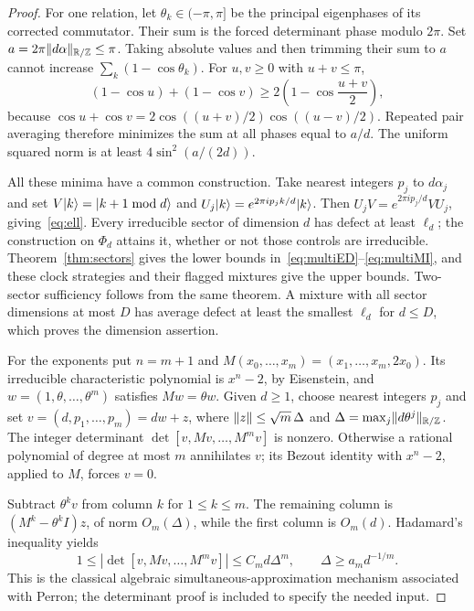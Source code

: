 \begin{proof}
For one relation, let $\theta_k\in(-\pi,\pi]$ be the principal eigenphases of its corrected commutator. Their sum is the forced determinant phase modulo $2\pi$. Set $a=2\pi\lVert d\alpha\rVert_{\mathbb R/\mathbb Z}\le\pi$. Taking absolute values and then trimming their sum to $a$ cannot increase $\sum_k(1-\cos\theta_k)$. For $u,v\ge0$ with $u+v\le\pi$,
\[
 (1-\cos u)+(1-\cos v)\ge2\left(1-\cos\frac{u+v}2\right),
\]
because $\cos u+\cos v=2\cos((u+v)/2)\cos((u-v)/2)$. Repeated pair averaging therefore minimizes the sum at all phases equal to $a/d$. The uniform squared norm is at least $4\sin^2(a/(2d))$.

All these minima have a common construction. Take nearest integers $p_j$ to $d\alpha_j$ and set $V|k\rangle=|k+1\bmod d\rangle$ and $U_j|k\rangle=e^{2\pi ip_jk/d}|k\rangle$. Then $U_jV=e^{2\pi ip_j/d}VU_j$, giving~\eqref{eq:ell}. Every irreducible sector of dimension $d$ has defect at least $\ell_d$; the construction on $\Phi_d$ attains it, whether or not those controls are irreducible. Theorem~\ref{thm:sectors} gives the lower bounds in~\eqref{eq:multiED}--\eqref{eq:multiMI}, and these clock strategies and their flagged mixtures give the upper bounds. Two-sector sufficiency follows from the same theorem. A mixture with all sector dimensions at most $D$ has average defect at least the smallest $\ell_d$ for $d\le D$, which proves the dimension assertion.

For the exponents put $n=m+1$ and $M(x_0,\ldots,x_m)=(x_1,\ldots,x_m,2x_0)$. Its irreducible characteristic polynomial is $x^n-2$, by Eisenstein, and $w=(1,\theta,\ldots,\theta^m)$ satisfies $Mw=\theta w$. Given $d\ge1$, choose nearest integers $p_j$ and set $v=(d,p_1,\ldots,p_m)=dw+z$, where $\lVert z\rVert\le\sqrt m\,\Delta$ and $\Delta=\max_j\lVert d\theta^j\rVert_{\mathbb R/\mathbb Z}$. The integer determinant $\det[v,Mv,\ldots,M^mv]$ is nonzero. Otherwise a rational polynomial of degree at most $m$ annihilates $v$; its Bezout identity with $x^n-2$, applied to $M$, forces $v=0$.

Subtract $\theta^kv$ from column $k$ for $1\le k\le m$. The remaining column is $(M^k-\theta^kI)z$, of norm $O_m(\Delta)$, while the first column is $O_m(d)$. Hadamard's inequality yields
\begin{equation}
 1\le|\det[v,Mv,\ldots,M^mv]|\le C_m d\Delta^m,
 \qquad \Delta\ge a_m d^{-1/m}.\label{eq:perron}
\end{equation}
This is the classical algebraic simultaneous-approximation mechanism associated with Perron; the determinant proof is included to specify the needed input.


\end{proof}
